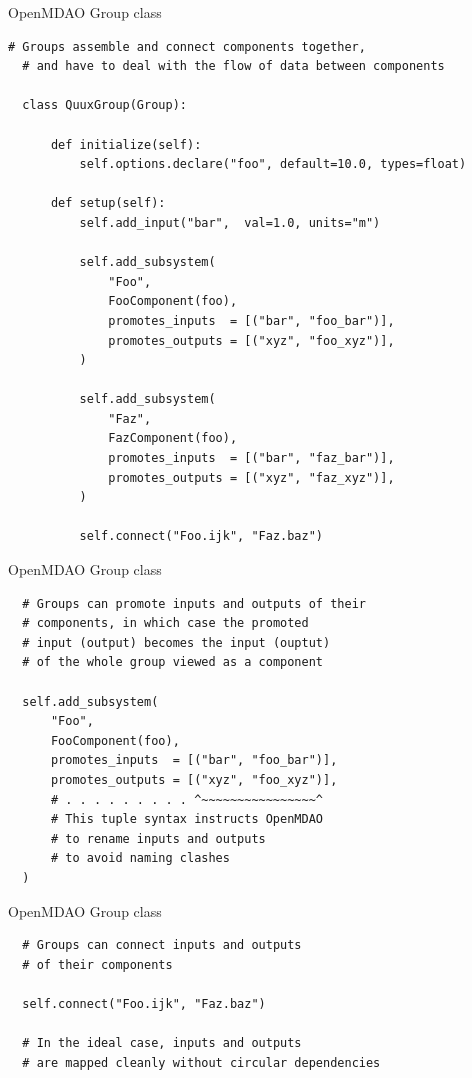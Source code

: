 \begin{frame}[fragile]{OpenMDAO Group class}
  \begin{lstlisting}[basicstyle=\ttfamily\tiny]
  # Groups assemble and connect components together,
  # and have to deal with the flow of data between components

  class QuuxGroup(Group):

      def initialize(self):
          self.options.declare("foo", default=10.0, types=float)

      def setup(self):
          self.add_input("bar",  val=1.0, units="m")

          self.add_subsystem(
              "Foo",
              FooComponent(foo),
              promotes_inputs  = [("bar", "foo_bar")],
              promotes_outputs = [("xyz", "foo_xyz")],
          )

          self.add_subsystem(
              "Faz",
              FazComponent(foo),
              promotes_inputs  = [("bar", "faz_bar")],
              promotes_outputs = [("xyz", "faz_xyz")],
          )

          self.connect("Foo.ijk", "Faz.baz")
  \end{lstlisting}
\end{frame}

\begin{frame}[fragile]{OpenMDAO Group class}
  \begin{lstlisting}
  # Groups can promote inputs and outputs of their
  # components, in which case the promoted
  # input (output) becomes the input (ouptut)
  # of the whole group viewed as a component

  self.add_subsystem(
      "Foo",
      FooComponent(foo),
      promotes_inputs  = [("bar", "foo_bar")],
      promotes_outputs = [("xyz", "foo_xyz")],
      # . . . . . . . . . ^~~~~~~~~~~~~~~~~^
      # This tuple syntax instructs OpenMDAO
      # to rename inputs and outputs
      # to avoid naming clashes
  )
  \end{lstlisting}
\end{frame}

\begin{frame}[fragile]{OpenMDAO Group class}
  \begin{lstlisting}
  # Groups can connect inputs and outputs
  # of their components

  self.connect("Foo.ijk", "Faz.baz")

  # In the ideal case, inputs and outputs
  # are mapped cleanly without circular dependencies
  \end{lstlisting}
\end{frame}

